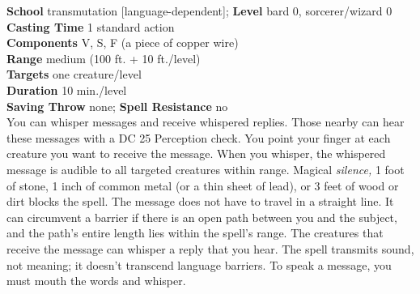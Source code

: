 \textbf{School} transmutation [language-dependent]; \textbf{Level} bard 0, sorcerer/wizard 0\\
\textbf{Casting Time} 1 standard action\\
\textbf{Components} V, S, F (a piece of copper wire)\\
\textbf{Range }medium (100 ft. + 10 ft./level)\\
\textbf{Targets} one creature/level\\
\textbf{Duration} 10 min./level\\
\textbf{Saving Throw} none; \textbf{Spell Resistance} no\\
You can whisper messages and receive whispered replies. Those nearby can hear these messages with a DC 25 Perception check. You point your finger at each creature you want to receive the message. When you whisper, the whispered message is audible to all targeted creatures within range. Magical \textit{silence, }1 foot of stone, 1 inch of common metal (or a thin sheet of lead), or 3 feet of wood or dirt blocks the spell. The message does not have to travel in a straight line. It can circumvent a barrier if there is an open path between you and the subject, and the path's entire length lies within the spell's range. The creatures that receive the message can whisper a reply that you hear. The spell transmits sound, not meaning; it doesn't transcend language barriers. To speak a message, you must mouth the words and whisper.\\
